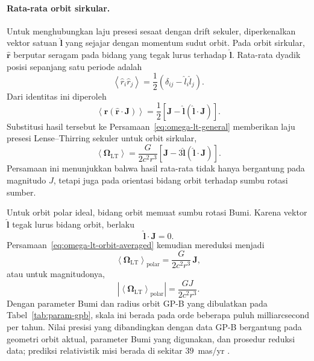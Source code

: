 \paragraph{Rata-rata orbit sirkular.}
Untuk menghubungkan laju presesi sesaat dengan drift sekuler, diperkenalkan
vektor satuan $\hat{\mathbf{l}}$ yang sejajar dengan momentum sudut orbit.
Pada orbit sirkular, $\hat{\mathbf{r}}$ berputar seragam pada bidang yang
tegak lurus terhadap $\hat{\mathbf{l}}$. Rata-rata dyadik posisi sepanjang
satu periode adalah
\begin{equation}
    \left\langle
        \hat{r}_i\hat{r}_j
    \right\rangle
    =\frac{1}{2}
    \left(
        \delta_{ij}
        -\hat{l}_i\hat{l}_j
    \right).
    \label{eq:orbital-average-rhat-dyad}
\end{equation}
Dari identitas ini diperoleh
\begin{equation}
    \left\langle
        \hat{\mathbf{r}}
        \left(\hat{\mathbf{r}}\cdot\mathbf{J}\right)
    \right\rangle
    =\frac{1}{2}
    \left[
        \mathbf{J}
        -\hat{\mathbf{l}}
        \left(\hat{\mathbf{l}}\cdot\mathbf{J}\right)
    \right].
    \label{eq:orbital-average-rhatJ}
\end{equation}
Substitusi hasil tersebut ke Persamaan~\eqref{eq:omega-lt-general}
memberikan laju presesi Lense--Thirring sekuler untuk orbit sirkular,
\begin{equation}
    \left\langle\bm{\Omega}_{\mathrm{LT}}\right\rangle
    =\frac{G}{2c^2r^3}
    \left[
        \mathbf{J}
        -3\hat{\mathbf{l}}
        \left(\hat{\mathbf{l}}\cdot\mathbf{J}\right)
    \right].
    \label{eq:omega-lt-orbit-averaged}
\end{equation}
Persamaan ini menunjukkan bahwa hasil rata-rata tidak hanya bergantung pada
magnitudo $J$, tetapi juga pada orientasi bidang orbit terhadap sumbu rotasi
sumber.

Untuk orbit polar ideal, bidang orbit memuat sumbu rotasi Bumi. Karena
vektor $\hat{\mathbf{l}}$ tegak lurus bidang orbit, berlaku
\begin{equation}
    \hat{\mathbf{l}}\cdot\mathbf{J}=0.
    \label{eq:polar-orbit-condition}
\end{equation}
Persamaan~\eqref{eq:omega-lt-orbit-averaged} kemudian mereduksi menjadi
\begin{equation}
    \left\langle\bm{\Omega}_{\mathrm{LT}}\right\rangle_{\mathrm{polar}}
    =\frac{G}{2c^2r^3}\,\mathbf{J},
    \label{eq:omega-lt-polar-average}
\end{equation}
atau untuk magnitudonya,
\begin{equation}
    \left|\left\langle\bm{\Omega}_{\mathrm{LT}}\right\rangle_{\mathrm{polar}}\right|
    =\frac{GJ}{2c^2r^3}.
    \label{eq:omega-lt-polar-magnitude}
\end{equation}
Dengan parameter Bumi dan radius orbit GP-B yang dibulatkan pada
Tabel~\ref{tab:param-gpb}, skala ini berada pada orde beberapa puluh
milliarcsecond per tahun. Nilai presisi yang dibandingkan dengan data GP-B
bergantung pada geometri orbit aktual, parameter Bumi yang digunakan, dan
prosedur reduksi data; prediksi relativistik misi berada di sekitar
$39$~mas/yr \parencite{Everitt2011GravityProbeB}.

